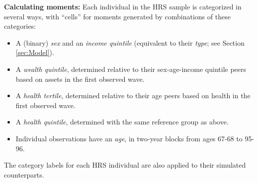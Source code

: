 \documentclass[12pt,pdftex,letterpaper]{article}
\begin{document}
\vspace{0.5cm}

\noindent \textbf{Calculating moments:} Each individual in the HRS sample is categorized in several ways, with ``cells'' for moments generated by combinations of these categories:
\begin{itemize}
\item A (binary) \textit{sex} and an \textit{income quintile} (equivalent to their \textit{type}; see Section \ref{sec:Model}).

\item A \textit{wealth quintile}, determined relative to their sex-age-income quintile peers based on assets in the first observed wave.

\item A \textit{health tertile}, determined relative to their age peers based on health in the first observed wave.

\item A \textit{health quintile}, determined with the same reference group as above.

\item Individual observations have an \textit{age}, in two-year blocks from ages 67-68 to 95-96.
\end{itemize}
The category labels for each HRS individual are also applied to their simulated counterparts.
\end{document}
